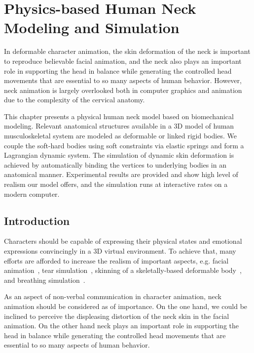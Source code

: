 \chapter{Physics-based Human Neck Modeling and Simulation}
\label{ch:vriphys}
In deformable character animation, the skin deformation of the neck is important to reproduce believable facial animation, and the neck also plays an important role in supporting the head in balance while generating the controlled head movements that are essential to so many aspects of human behavior. However, neck animation is largely overlooked both in computer graphics and animation due to the complexity of the cervical anatomy.

This chapter presents a physical human neck model based on biomechanical modeling. Relevant anatomical structures available in a 3D model of human musculoskeletal system are modeled as deformable or linked rigid bodies. We couple the soft-hard bodies using soft constraints via elastic springs and form a Lagrangian dynamic system. The simulation of dynamic skin deformation is achieved by automatically binding the vertices to underlying bodies in an anatomical manner. Experimental results are provided and show high level of realism our model offers, and the simulation runs at interactive rates on a modern computer.

\section{Introduction}
\label{sec:intro}
Characters should be capable of expressing their physical states and emotional expressions convincingly in a 3D virtual environment. To achieve that, many efforts are afforded to increase the realism of important aspects, e.g. facial animation~\cite{Sifakis:2005:facial,Fratarcangeli:2005:physically,Zhang:2004:NPM}, tear simulation~\cite{van:2009:real}, skinning of a skeletally-based deformable body~\cite{Kavan:2007:SDQ}, and breathing simulation~\cite{Zordan:2004:breathe}.

As an aspect of non-verbal communication in character animation, neck animation should be considered as of importance. On the one hand, we could be inclined to perceive the displeasing distortion of the neck skin in the facial animation. On the other hand neck plays an important role in supporting the head in balance while generating the controlled head movements that are essential to so many aspects of human behavior.

